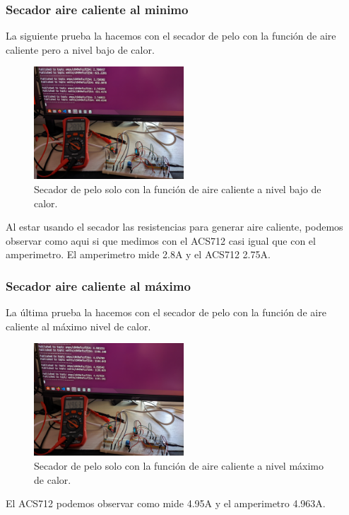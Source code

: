 \begin{titlepage}
\subsubsection{Secador aire caliente al minimo}
La siguiente prueba la hacemos con el secador de pelo con la función de aire caliente pero a nivel bajo de calor.\\
\begin{figure}[h!]
	\centering
	\includegraphics[width=0.5\textwidth]{imagenes/AC_2_8Amps.jpg}
	\caption{Secador de pelo solo con la función de aire caliente a nivel bajo de calor.}
\end{figure}
Al estar usando el secador las resistencias para generar aire caliente, podemos observar como aqui si que medimos con el ACS712 casi igual que con el amperimetro.
El amperimetro mide 2.8A y el ACS712 2.75A. \\
\subsubsection{Secador aire caliente al máximo}
La última prueba la hacemos con el secador de pelo con la función de aire caliente al máximo nivel de calor.\\
\begin{figure}[h!]
	\centering
	\includegraphics[width=0.5\textwidth]{imagenes/AC_4_9Amps.jpg}
	\caption{Secador de pelo solo con la función de aire caliente a nivel máximo de calor.}
\end{figure}
El ACS712 podemos observar como mide 4.95A y el amperimetro 4.963A.\\


\end{titlepage}
